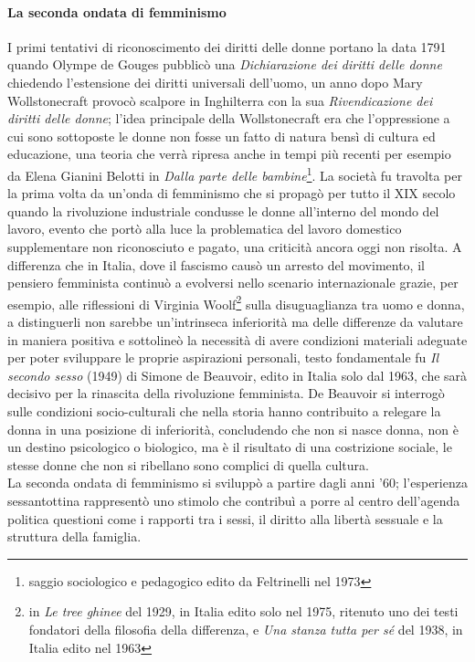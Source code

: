 \paragraph{La seconda ondata di femminismo}
I primi tentativi di riconoscimento dei diritti delle donne portano la data 1791 quando Olympe de Gouges pubblicò una \textit{Dichiarazione dei diritti delle donne} chiedendo l'estensione dei diritti universali dell'uomo, un anno dopo Mary Wollstonecraft provocò scalpore in Inghilterra con la sua \textit{Rivendicazione dei diritti delle donne}; l'idea principale della Wollstonecraft era che l'oppressione a cui sono sottoposte le donne non fosse un fatto di natura bensì di cultura ed educazione, una teoria che verrà ripresa anche in tempi più recenti per esempio da Elena Gianini Belotti in \textit{Dalla parte delle bambine}\footnote{saggio sociologico e pedagogico edito da Feltrinelli nel 1973}.
La società fu travolta per la prima volta da un'onda di femminismo che si propagò per tutto il XIX secolo quando la rivoluzione industriale condusse le donne all'interno del mondo del lavoro, evento che portò alla luce la problematica del lavoro domestico supplementare non riconosciuto e pagato, una criticità ancora oggi non risolta. 
A differenza che in Italia, dove il fascismo causò un arresto del movimento, il pensiero femminista continuò a evolversi nello scenario internazionale grazie, per esempio, alle riflessioni di Virginia Woolf\footnote{in \textit{Le tree ghinee} del 1929, in Italia edito solo nel 1975, ritenuto uno dei testi fondatori della filosofia della differenza, e \textit{Una stanza tutta per sé} del 1938, in Italia edito nel 1963} sulla disuguaglianza tra uomo e donna, a distinguerli non sarebbe un'intrinseca inferiorità ma delle differenze da valutare in maniera positiva e sottolineò la necessità di avere condizioni materiali adeguate per poter sviluppare le proprie aspirazioni personali, testo fondamentale fu  \textit{Il secondo sesso} (1949) di Simone de Beauvoir, edito in Italia solo dal 1963, che sarà decisivo per la rinascita della rivoluzione femminista. De Beauvoir si interrogò sulle condizioni socio-culturali che nella storia hanno contribuito a relegare la donna in una posizione di inferiorità, concludendo che non si nasce donna, non è un destino psicologico o biologico, ma è il risultato di una costrizione sociale, le stesse donne che non si ribellano sono complici di quella cultura. \\
La seconda ondata di femminismo si sviluppò a partire dagli anni '60; l'esperienza sessantottina rappresentò uno stimolo che contribuì a porre al centro dell'agenda politica questioni come i rapporti tra i sessi, il diritto alla libertà sessuale e la struttura della famiglia.
